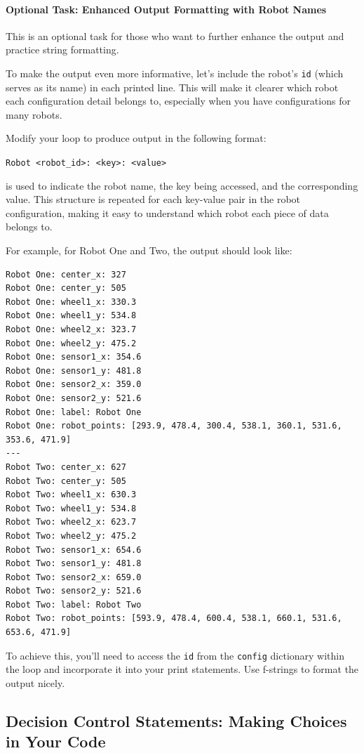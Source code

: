 \paragraph{Optional Task: Enhanced Output Formatting with Robot Names}

This is an optional task for those who want to further enhance the output and practice string formatting.

To make the output even more informative, let's include the robot's \texttt{id} (which serves as its name) in each printed line. This will make it clearer which robot each configuration detail belongs to, especially when you have configurations for many robots.

Modify your loop to produce output in the following format:

\texttt{Robot <robot\_id>: <key>: <value>}


is used to indicate the robot name, the key being accessed, and the corresponding value. This structure is repeated for each key-value pair in the robot configuration, making it easy to understand which robot each piece of data belongs to.


For example, for Robot One and Two, the output should look like:

\begin{verbatim}
Robot One: center_x: 327
Robot One: center_y: 505
Robot One: wheel1_x: 330.3
Robot One: wheel1_y: 534.8
Robot One: wheel2_x: 323.7
Robot One: wheel2_y: 475.2
Robot One: sensor1_x: 354.6
Robot One: sensor1_y: 481.8
Robot One: sensor2_x: 359.0
Robot One: sensor2_y: 521.6
Robot One: label: Robot One
Robot One: robot_points: [293.9, 478.4, 300.4, 538.1, 360.1, 531.6, 353.6, 471.9]
---
Robot Two: center_x: 627
Robot Two: center_y: 505
Robot Two: wheel1_x: 630.3
Robot Two: wheel1_y: 534.8
Robot Two: wheel2_x: 623.7
Robot Two: wheel2_y: 475.2
Robot Two: sensor1_x: 654.6
Robot Two: sensor1_y: 481.8
Robot Two: sensor2_x: 659.0
Robot Two: sensor2_y: 521.6
Robot Two: label: Robot Two
Robot Two: robot_points: [593.9, 478.4, 600.4, 538.1, 660.1, 531.6, 653.6, 471.9]
\end{verbatim}

To achieve this, you'll need to access the \texttt{id} from the \texttt{config} dictionary within the loop and incorporate it into your print statements. Use f-strings to format the output nicely.


\newpage
\subsection{Decision Control Statements: Making Choices in Your Code}

